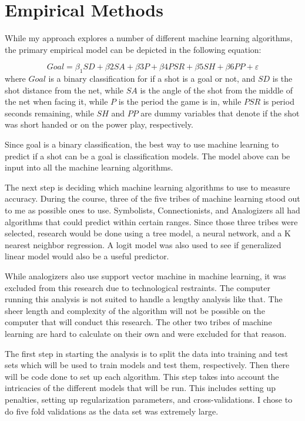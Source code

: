 \documentclass[12pt,english]{article}
\begin{document}
\section{Empirical Methods}\label{sec:methods}
While my approach explores a number of different machine learning algorithms, the primary empirical model can be depicted in the following equation:

\begin{equation}
\label{eq:1}
Goal=\beta_{1} SD + \beta{2} SA + \beta{3} P + \beta{4} PSR + \beta{5} SH + \beta{6} PP + \varepsilon
\end{equation}
where $Goal$ is a binary classification for if a shot is a goal or not, and $SD$ is the shot distance from the net, while $SA$ is the angle of the shot from the middle of the net when facing it, while $P$ is the period the game is in, while $PSR$ is period seconds remaining, while $SH$ and $PP$ are dummy variables that denote if the shot was short handed or on the power play, respectively. 

Since goal is a binary classification, the best way to use machine learning to predict if a shot can be a goal is classification models. The model above can be input into all the machine learning algorithms. 

The next step is deciding which machine learning algorithms to use to measure accuracy. During the course, three of the five tribes of machine learning stood out to me as possible ones to use. Symbolists, Connectionists, and Analogizers all had algorithms that could predict within certain ranges. Since those three tribes were selected, research would be done using a tree model, a neural network, and a K nearest neighbor regression. A logit model was also used to see if generalized linear model would also be a useful predictor. 

While analogizers also use support vector machine in machine learning, it was excluded from this research due to technological restraints. The computer running this analysis is not suited to handle a lengthy analysis like that. The sheer length and complexity of the algorithm will not be possible on the computer that will conduct this research. The other two tribes of machine learning are hard to calculate on their own and were excluded for that reason. 

The first step in starting the analysis is to split the data into training and test sets which will be used to train models and test them, respectively. Then there will be code done to set up each algorithm. This step takes into account the intricacies of the different models that will be run. This includes setting up penalties, setting up regularization parameters, and cross-validations. I chose to do five fold validations as the data set was extremely large. 
\end{document}

